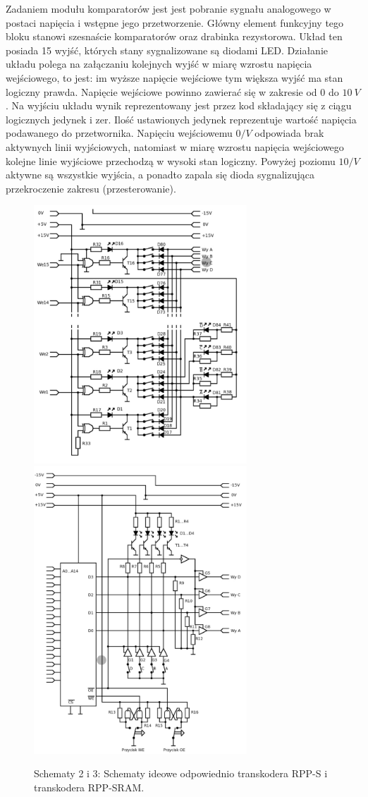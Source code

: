 \documentclass[14pt, table]{extarticle}
\begin{document}
Zadaniem modułu komparatorów jest jest pobranie sygnału analogowego w postaci napięcia i wstępne jego przetworzenie. Główny element funkcyjny tego bloku stanowi szesnaście komparatorów oraz drabinka rezystorowa. Układ ten posiada 15 wyjść, których stany sygnalizowane są diodami LED. Działanie układu polega na załączaniu kolejnych wyjść w miarę wzrostu napięcia wejściowego, to jest: im wyższe napięcie wejściowe tym większa wyjść ma stan logiczny prawda. Napięcie wejściowe powinno zawierać się w zakresie od $0$ do $10 \ V$. Na wyjściu układu wynik reprezentowany jest przez kod składający się z ciągu logicznych jedynek i zer. Ilość ustawionych jedynek reprezentuje wartość napięcia podawanego do przetwornika. Napięciu wejściowemu $0 / V$ odpowiada brak aktywnych linii wyjściowych, natomiast w miarę wzrostu napięcia wejściowego kolejne linie wyjściowe przechodzą w wysoki stan logiczny. Powyżej poziomu $10 / V$ aktywne są wszystkie wyjścia, a ponadto zapala się dioda sygnalizująca przekroczenie zakresu (przesterowanie). \\

\begin{figure}[H]
\includegraphics[width=8cm]{D1}
\includegraphics[width=8cm]{D2}
\centering
\captionsetup{labelformat=empty}
\caption{Schematy 2 i 3: Schematy ideowe odpowiednio transkodera RPP-S i transkodera RPP-SRAM.}
\end{figure}
\end{document}
